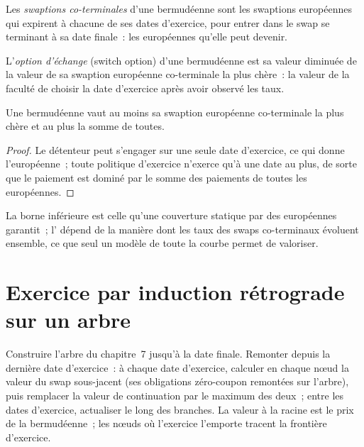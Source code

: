 \begin{definition}\label{def:rc:bermudans-and-callables:coterminal}
Les \emph{swaptions co-terminales} d'une bermudéenne sont les
swaptions européennes qui expirent à chacune de ses dates d'exercice, pour entrer dans le swap se terminant
à sa date finale~: les européennes qu'elle peut devenir.
\end{definition}

\begin{definition}\label{def:rc:bermudans-and-callables:switch}
L'\emph{option d'échange} (switch option) d'une bermudéenne est sa valeur diminuée de la
valeur de sa swaption européenne co-terminale la plus chère~: la valeur de la faculté de
choisir la date d'exercice après avoir observé les taux.
\end{definition}

\begin{proposition}\label{prop:rc:bermudans-and-callables:bounds}
Une bermudéenne vaut au moins sa swaption européenne co-terminale la plus chère et au plus
la somme de toutes.
\end{proposition}
\begin{proof}
Le détenteur peut s'engager sur une seule date d'exercice, ce qui donne l'européenne~; toute
politique d'exercice n'exerce qu'à une date au plus, de sorte que le paiement est dominé par le
somme des paiements de toutes les européennes.
\end{proof}

La borne inférieure est celle qu'une couverture statique par des européennes garantit~; l'
dépend de la manière dont les taux des swaps co-terminaux évoluent ensemble, ce que seul un modèle
de toute la courbe permet de valoriser.

\section{Exercice par induction rétrograde sur un arbre}

\begin{method}\label{met:rc:bermudans-and-callables:tree}
Construire l'arbre du chapitre~7 jusqu'à la date finale. Remonter depuis la dernière date d'exercice~:
à chaque date d'exercice, calculer en chaque nœud la valeur du swap sous-jacent
(ses obligations zéro-coupon remontées sur l'arbre), puis remplacer la valeur de continuation
par le maximum des deux~; entre les dates d'exercice, actualiser le long des
branches. La valeur à la racine est le prix de la bermudéenne~; les nœuds où
l'exercice l'emporte tracent la frontière d'exercice.
\end{method}

